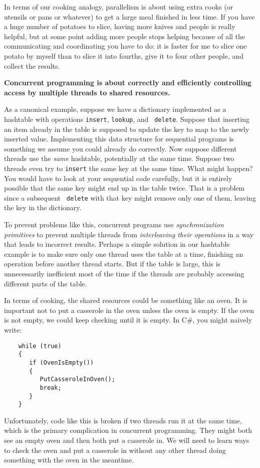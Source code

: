 \documentclass[10pt]{article}
\begin{document}
In terms of our cooking analogy, parallelism is about using extra
cooks (or utensils or pans or whatever) to get a large meal finished
in less time.  If you have a huge number of potatoes to slice, having
more knives and people is really helpful, but at some point adding
more people stops helping because of all the communicating and
coordinating you have to do: it is faster for me to slice one potato by
myself than to slice it into fourths, give it to four other people, and
collect the results.

\medskip
\noindent\textbf{Concurrent programming is about correctly and efficiently
  controlling access by multiple threads to shared resources.}
\medskip

As a canonical example, suppose we have a dictionary implemented as a
hashtable with operations {\tt insert}, {\tt lookup}, and {\tt
  delete}.  Suppose that inserting an item already in the table is
supposed to update the key to map to the newly inserted value.
Implementing this data structure for sequential programs is something
we assume you could already do correctly.  Now suppose different
threads use the \emph{same} hashtable, potentially at the same time.
Suppose two threads even try to {\tt insert} the same key at the same
time.  What might happen?  You would have to look at your sequential
code carefully, but it is entirely possible that the same key might
end up in the table twice.  That is a problem since a subsequent {\tt
  delete} with that key might remove only one of them, leaving the key
in the dictionary.

To prevent problems like this, concurrent programs use
\emph{synchronization primitives} to prevent multiple threads from
\emph{interleaving their operations} in a way that leads to incorrect
results.  Perhaps a simple solution in our hashtable example is to
make sure only one thread uses the table at a time, finishing an
operation before another thread starts.  But if the table is large,
this is unnecessarily inefficient most of the time if the threads
are probably accessing different parts of the table.

In terms of cooking, the shared resources could be something like an
oven.  It is important not to put a casserole in the oven unless the
oven is empty.  If the oven is not empty, we could keep checking until
it is empty.  In C\#, you might naively write:
\begin{verbatim}
    while (true)
    {
       if (OvenIsEmpty())
       {
          PutCasseroleInOven();
          break;
       }
    }
\end{verbatim}
Unfortunately, code like this is broken if two threads run it at the
same time, which is the primary complication in concurrent programming.  They
might both see an empty oven and then both put a casserole in.  We
will need to learn ways to check the oven and put a casserole in
without any other thread doing something with the oven in the
meantime.
\end{document}
